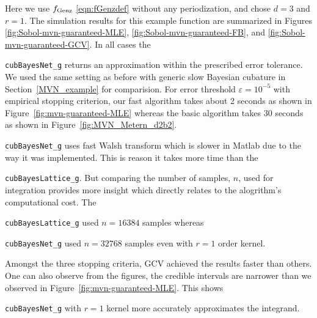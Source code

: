 \documentclass{iitthesis}          %
\newcommand{\code}[1]{\texttt{#1}}
\newcommand\figref{Figure~\ref}
\newcommand\secref{Section~\ref}
\begin{document}
\Subsection{Using \code{cubBayesNet\_g}}
Here we use $ f_{\textup{Genz}}$ \eqref{eqn:fGenzdef} without any periodization, and chose $d=3$ and $r=1$. The simulation results for this example function are summarized in Figures \ref{fig:Sobol-mvn-guaranteed-MLE}, \ref{fig:Sobol-mvn-guaranteed-FB}, and \ref{fig:Sobol-mvn-guaranteed-GCV}.  In all cases the {\code{cubBayesNet\_g} returns an approximation within the prescribed error tolerance. We used the same setting as before with generic slow Bayesian cubature in \secref{MVN_example} for comparision. For error threshold $\varepsilon=10^{-5}$ with empirical stopping criterion, our fast algorithm takes about 2 seconds as shown in \figref{fig:mvn-guaranteed-MLE} whereas the basic algorithm takes 30 seconds as shown in \figref{fig:MVN_Metern_d2b2}. 
{\code{cubBayesNet\_g} uses fast Walsh transform which is slower in Matlab due to the way it was implemented. This is reason it takes more time than the {\code{cubBayesLattice\_g}. 
But comparing the number of samples, $n$, used for integration provides more insight which directly relates to the alogrithm's computational cost. The {\code{cubBayesLattice\_g} used $n=16384$ samples whereas {\code{cubBayesNet\_g} used $n=32768$ samples even with $r=1$ order kernel.

Amongst the three stopping criteria, GCV achieved the results faster than others. 
One can also observe from the figures, the credible intervals are narrower than we observed in \figref{fig:mvn-guaranteed-MLE}.
This shows {\code{cubBayesNet\_g} with $r=1$ kernel more accurately approximates the integrand.

}}}}}}
\end{document}
